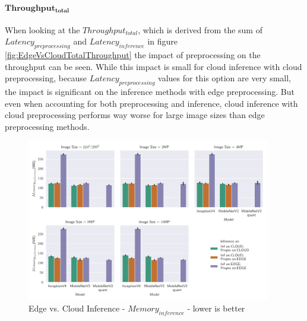 \paragraph{$\mathbf{Throughput_{total}}$}
When looking at the $Throughput_{total}$, which is derived from the sum of $Latency_{preprocessing}$ and $Latency_{inference}$ in figure \ref{fig:EdgeVsCloudTotalThroughput} the impact of preprocessing on the throughput can be seen.
While this impact is small for cloud inference with cloud preprocessing, because $Latency_{preprocessing}$ values for this option are very small, the impact is significant on the inference methods with edge preprocessing.
But even when accounting for both preprocessing and inference, cloud inference with cloud preprocessing performs way worse for large image sizes than edge preprocessing methods.

\begin{figure}[!htb]
\centering
\includegraphics[width=0.95\textwidth]{./Bilder/single_plots/edge_vs_cloud_plots/Edge_vs_Cloud_Inference_Inference_Memory.pdf}
\caption{Edge vs. Cloud Inference -  $Memory_{inference}$ - lower is better}
\label{fig:EdgeVsCloudInferenceMemory}
\end{figure}

